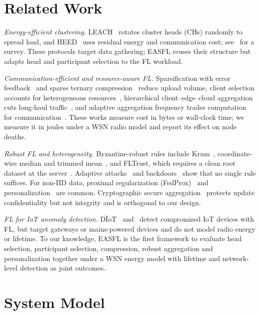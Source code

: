 \documentclass[journal]{IEEEtran}
\begin{document}
\section{Related Work}
\textit{Energy-efficient clustering.} LEACH~\cite{heinzelman2002} rotates cluster heads (CHs) randomly to spread load, and HEED~\cite{younis2004} uses residual energy and communication cost; see~\cite{abbasi2007} for a survey. These protocols target data gathering; EASFL reuses their structure but adapts head and participant selection to the FL workload.

\textit{Communication-efficient and resource-aware FL.} Sparsification with error feedback~\cite{lin2018dgc,stich2018} and sparse ternary compression~\cite{sattler2020} reduce upload volume, client selection accounts for heterogeneous resources~\cite{nishio2019}, hierarchical client--edge--cloud aggregation cuts long-haul traffic~\cite{liu2020hfl}, and adaptive aggregation frequency trades computation for communication~\cite{wang2019adaptive}. These works measure cost in bytes or wall-clock time; we measure it in joules under a WSN radio model and report its effect on node deaths.

\textit{Robust FL and heterogeneity.} Byzantine-robust rules include Krum~\cite{blanchard2017}, coordinate-wise median and trimmed mean~\cite{yin2018}, and FLTrust, which requires a clean root dataset at the server~\cite{cao2021}. Adaptive attacks~\cite{fang2020} and backdoors~\cite{bagdasaryan2020} show that no single rule suffices. For non-IID data, proximal regularization (FedProx)~\cite{li2020fedprox} and personalization~\cite{arivazhagan2019,tan2023} are common. Cryptographic secure aggregation~\cite{bonawitz2017} protects update confidentiality but not integrity and is orthogonal to our design.

\textit{FL for IoT anomaly detection.} D\"IoT~\cite{nguyen2019diot} and~\cite{mothukuri2022} detect compromised IoT devices with FL, but target gateways or mains-powered devices and do not model radio energy or lifetime. To our knowledge, EASFL is the first framework to evaluate head selection, participant selection, compression, robust aggregation and personalization together under a WSN energy model with lifetime and network-level detection as joint outcomes.

\section{System Model}\label{sec:model}
\end{document}
